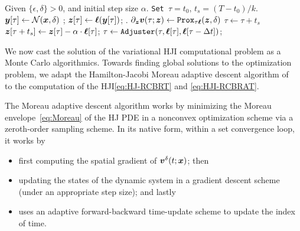 %
\begin{savenotes}
	\begin{algorithm}[t!]
		\caption{Sampling-based RCBRT descent.\label{alg:rcbrt-sample}}
		\begin{algorithmic}
			\State Given $\{\epsilon, \delta\}>0$, and initial step size $\alpha$.
			 
			\State \texttt{Set $\tau= t_0, \, t_s = (T-t_0)/k$}.
			\State $\bm{y}[\tau] \leftarrow \mathcal{N}(\bm{x}, \delta)$  \label{alg:rcbrt::sample}; 
			\State $\bm{z}[\tau] \leftarrow \bm{\ell}(\bm{y}[\tau])$; .
			\State $\partial_{\bm{z}}\bm{v}(\tau; \bm{z}) \leftarrow \texttt{Prox}_{\tau\bm{\ell}}(\bm{z}, \delta)$  \label{alg:rcbrt:prox_update}
			\State $\tau \leftarrow \tau + t_s$
			\State $\bm{z}[\tau + t_s] \leftarrow \bm{z}[\tau] - \alpha \cdot \bm{\ell}[\tau]$; \label{alg:rcbrt::time-adjuster}	
			\State $\tau \leftarrow \texttt{Adjuster}	(\tau, \bm{\ell}[\tau], \bm{\ell}[\tau-\Delta t])$;
			\EndWhile
			\EndFunction
		\end{algorithmic}
	\end{algorithm}
\end{savenotes}
We now cast the solution of the variational HJI computational problem as a Monte Carlo algorithmics. Towards finding global solutions to the optimization problem, we adapt the Hamilton-Jacobi Moreau adaptive descent algorithm of~\citet{HJMAD} to the computation of the HJI\eqref{eq:HJ-RCBRT} and \eqref{eq:HJI-RCBRAT}. %

The Moreau adaptive descent algorithm works by minimizing the Moreau envelope~\eqref{eq:Moreau} of the HJ PDE in a nonconvex optimization scheme via a zeroth-order sampling scheme. In its native form, within a set convergence loop, it works by 
%
\begin{itemize}
	\item first computing the spatial gradient of $\bm{v}^\delta(t; \bm{x})$; then
	\item updating the states of the dynamic system in a gradient descent scheme (under an appropriate step size); and lastly
	\item uses an adaptive forward-backward time-update scheme to update the index of time.
\end{itemize}
%


